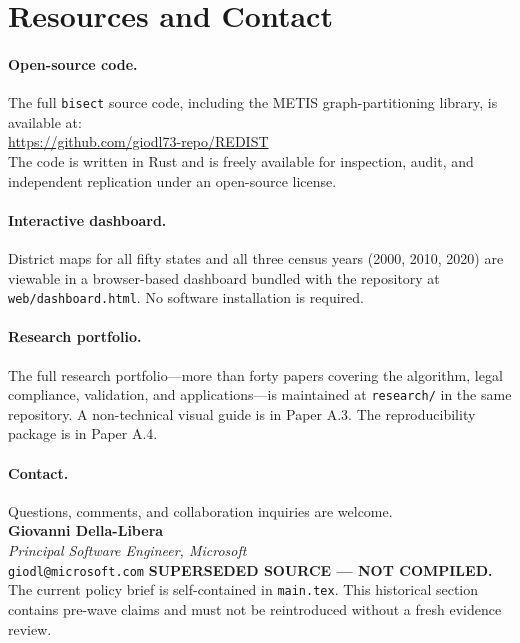 
\section{Resources and Contact}

\paragraph{Open-source code.}
The full \texttt{bisect} source code, including the METIS graph-partitioning
library, is available at:\\
\url{https://github.com/giodl73-repo/REDIST}\\
The code is written in Rust and is freely available for inspection,
audit, and independent replication under an open-source license.

\paragraph{Interactive dashboard.}
District maps for all fifty states and all three census years (2000, 2010, 2020)
are viewable in a browser-based dashboard bundled with the repository
at \texttt{web/dashboard.html}.
No software installation is required.

\paragraph{Research portfolio.}
The full research portfolio---more than forty papers covering
the algorithm, legal compliance, validation, and applications---is
maintained at \texttt{research/} in the same repository.
A non-technical visual guide is in Paper A.3.
The reproducibility package is in Paper A.4.

\paragraph{Contact.}
Questions, comments, and collaboration inquiries are welcome.\\[4pt]
\noindent\textbf{Giovanni Della-Libera}\\
\textit{Principal Software Engineer, Microsoft}\\
\texttt{giodl@microsoft.com}
\noindent\textbf{SUPERSEDED SOURCE --- NOT COMPILED.} The current policy brief
is self-contained in \texttt{main.tex}. This historical section contains
pre-wave claims and must not be reintroduced without a fresh evidence review.
